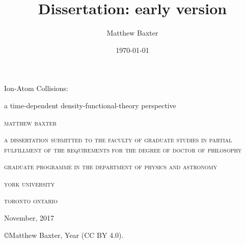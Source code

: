 \documentclass[a5paper, 9 pt]{extreport}
\title{Dissertation: early version}
\author{Matthew Baxter}
\date{\today}
\begin{document}

\begin{titlepage}

   \centering

   \phantom{Ghost, Booooo}

   \vspace{1 cm}

   {\Huge Ion-Atom Collisions:}

   {\large a time-dependent density-functional-theory perspective}

   \vspace{2 cm}

   \textsc{matthew baxter}

   \vspace{2 cm}

   \textsc{a dissertation submitted to the faculty of graduate studies in partial fulfillment of the
           requirements for the degree of doctor of philosophy}

   \vspace{2 cm}

   \textsc{graduate programme in the department of physics and astronomy}

   \textsc{york university}

   \textsc{toronto ontario}

   \vspace{1 cm}

   November, 2017

   \vspace{1 cm}

   \copyright Matthew Baxter, Year (\textsc{CC BY} 4.0).

   \thispagestyle{empty}

\end{titlepage}

\cleardoublepage
{}
{}
\end{document}
